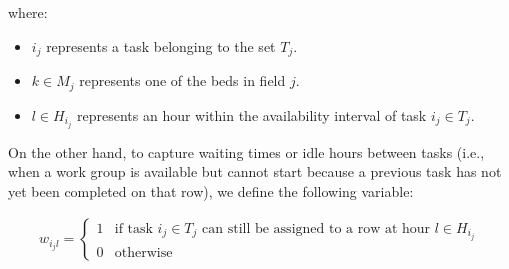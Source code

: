 where:
\begin{itemize}
    \item $i_j$ represents a task belonging to the set $T_j$.
    \item $k \in M_j$ represents one of the beds in field $j$.
    \item $l \in H_{i_j}$ represents an hour within the availability interval of task $i_j \in T_j$.
\end{itemize}


On the other hand, to capture waiting times or idle hours between tasks  
(i.e., when a work group is available but cannot start because a previous task has not yet been completed on that row), we define the following variable:

\[
\begin{aligned}
    w_{i_j l} = 
    \begin{cases} 
        1 & \text{if task } i_j \in T_j \text{ can still be assigned to a row at hour } l \in H_{i_j} \\
        0 & \text{otherwise}
    \end{cases}
\end{aligned}
\]


